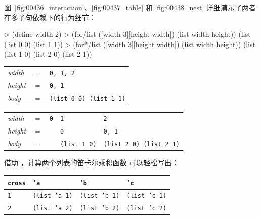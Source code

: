 图~\ref{fig:00436_interaction}、\ref{fig:00437_table} 和 \ref{fig:00438_nest} 详细演示了两者在多子句依赖下的行为细节：

\begin{replbox}
> (define width 2)
> (for/list ([width 3][height width])
    (list width height))
(list (list 0 0) (list 1 1))
> (for*/list ([width 3][height width])
    (list width height))
(list (list 1 0) (list 2 0) (list 2 1))
\end{replbox}
\label{fig:00436_interaction}

\begin{stepperbox}[unbreakable]
\centering\footnotesize
\begin{tabular}{lcl}
\toprule
\textit{width}  & $=$ & \texttt{0, 1, 2} \\
\textit{height} & $=$ & \texttt{0, 1} \\
\textit{body}   & $=$ & \texttt{(list 0 0) (list 1 1)} \\
\bottomrule
\end{tabular}
\end{stepperbox}
\label{fig:00437_table}

\begin{stepperbox}[unbreakable]
\centering\footnotesize
\setlength{\tabcolsep}{4pt}
\begin{tabular}{lclll}
\toprule
\textit{width}  & $=$ & \texttt{0} & \texttt{1} & \texttt{2} \\
\textit{height} & $=$ &            & \texttt{0} & \texttt{0, 1} \\
\textit{body}   & $=$ &            & \texttt{(list 1 0)} & \texttt{(list 2 0) (list 2 1)} \\
\bottomrule
\end{tabular}
\end{stepperbox}
\label{fig:00438_nest}

借助 ，计算两个列表的笛卡尔乘积函数  可以轻松写出：

\begin{stepperbox}[unbreakable]
\centering\scriptsize
\setlength{\tabcolsep}{4pt}
\begin{tabular}{l|lll}
\toprule
\texttt{cross} & \texttt{'a} & \texttt{'b} & \texttt{'c} \\
\midrule
\texttt{1} & \texttt{(list 'a 1)} & \texttt{(list 'b 1)} & \texttt{(list 'c 1)} \\
\texttt{2} & \texttt{(list 'a 2)} & \texttt{(list 'b 2)} & \texttt{(list 'c 2)} \\
\bottomrule
\end{tabular}
\end{stepperbox}

